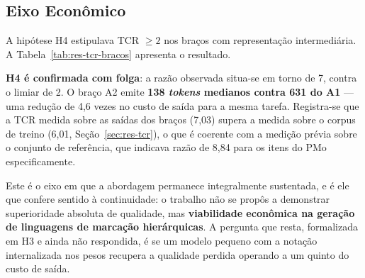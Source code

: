 \subsection{Eixo Econômico}
\label{subsec:res-economico}

A hipótese H4 estipulava TCR $\geq 2$ nos braços com representação intermediária. A Tabela~\ref{tab:res-tcr-bracos} apresenta o resultado.

\begin{table}[h!]
\end{table}

\textbf{H4 é confirmada com folga}: a razão observada situa-se em torno de 7, contra o limiar de 2. O braço A2 emite \textbf{138 \textit{tokens} medianos contra 631 do A1} — uma redução de 4,6 vezes no custo de saída para a mesma tarefa. Registra-se que a TCR medida sobre as saídas dos braços (7,03) supera a medida sobre o corpus de treino (6,01, Seção~\ref{sec:res-tcr}), o que é coerente com a medição prévia sobre o conjunto de referência, que indicava razão de 8,84 para os itens do PMo especificamente.

Este é o eixo em que a abordagem permanece integralmente sustentada, e é ele que confere sentido à continuidade: o trabalho não se propôs a demonstrar superioridade absoluta de qualidade, mas \textbf{viabilidade econômica na geração de linguagens de marcação hierárquicas}. A pergunta que resta, formalizada em H3 e ainda não respondida, é se um modelo pequeno com a notação internalizada nos pesos recupera a qualidade perdida operando a um quinto do custo de saída.


